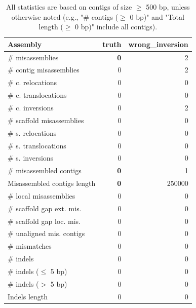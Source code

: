 \documentclass[12pt,a4paper]{article}
\begin{document}
\begin{table}[ht]
\begin{center}
\caption{All statistics are based on contigs of size $\geq$ 500 bp, unless otherwise noted (e.g., "\# contigs ($\geq$ 0 bp)" and "Total length ($\geq$ 0 bp)" include all contigs).}
\begin{tabular}{|l*{2}{|r}|}
\hline
Assembly & truth & wrong\_inversion \\ \hline
\# misassemblies & {\bf 0} & 2 \\ \hline
\hspace{2mm}\# contig misassemblies & 0 & 2 \\ \hline
\hspace{5mm}\# c. relocations & 0 & 0 \\ \hline
\hspace{5mm}\# c. translocations & 0 & 0 \\ \hline
\hspace{5mm}\# c. inversions & 0 & 2 \\ \hline
\hspace{2mm}\# scaffold misassemblies & 0 & 0 \\ \hline
\hspace{5mm}\# s. relocations & 0 & 0 \\ \hline
\hspace{5mm}\# s. translocations & 0 & 0 \\ \hline
\hspace{5mm}\# s. inversions & 0 & 0 \\ \hline
\# misassembled contigs & {\bf 0} & 1 \\ \hline
Misassembled contigs length & {\bf 0} & 250000 \\ \hline
\# local misassemblies & 0 & 0 \\ \hline
\# scaffold gap ext. mis. & 0 & 0 \\ \hline
\# scaffold gap loc. mis. & 0 & 0 \\ \hline
\# unaligned mis. contigs & 0 & 0 \\ \hline
\# mismatches & 0 & 0 \\ \hline
\# indels & 0 & 0 \\ \hline
\hspace{5mm}\# indels ($\leq$ 5 bp) & 0 & 0 \\ \hline
\hspace{5mm}\# indels ($>$ 5 bp) & 0 & 0 \\ \hline
Indels length & 0 & 0 \\ \hline
\end{tabular}
\end{center}
\end{table}
\end{document}

